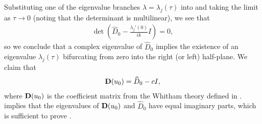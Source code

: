 \documentclass[11pt,leqno]{article}
\numberwithin{equation}{section}
\theoremstyle{definition}
\begin{document}
Substituting one of the eigenvalue branches $ \lambda = \lambda_{j}(\tau) $ into  and taking the limit as $ \tau \rightarrow 0 $ (noting that the determinant is multilinear), we see that
\begin{align*}
	\det(\widehat{D}_{0} - \frac{\lambda_{j}'(0)}{ik}I) = 0,
\end{align*}
so we conclude that a complex eigenvalue of $ \widehat{D}_{0} $ implies the existence of an eigenvalue $ \lambda_{j}(\tau) $ bifurcating from zero into the right (or left) half-plane. We claim that
\begin{align}
	{\bf D}(u_{0}) = \widehat{D}_{0} - cI,\label{eq:connection}
\end{align}
where $ {\bf D}(u_{0}) $ is the coefficient matrix from the Whitham theory defined in .  implies that the eigenvalues of $ {\bf D}(u_{0}) $ and $ \widehat{D}_{0} $ have equal imaginary parts, which is sufficient to prove .
\end{document}
